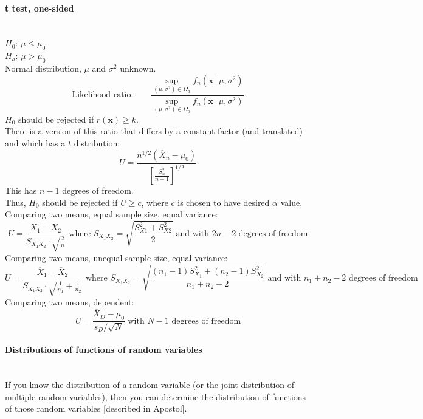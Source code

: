 \documentclass[10pt]{article}
\begin{document}
\paragraph{t test, one-sided}\ \\
$H_0$: $\mu \leq \mu_0$\\
$H_a$: $\mu > \mu_0$\\
Normal distribution, $\mu$ and $\sigma^2$ unknown.
\begin{equation*}
\text{Likelihood ratio:} \qquad \frac{\sup_{(\mu,\sigma^2)\in\Omega_a}{f_n(\boldsymbol{x}\,|\,\mu, \sigma^2)}}
{\sup_{(\mu,\sigma^2)\in\Omega_0}f_n(\boldsymbol{x}\,|\,\mu, \sigma^2)}
\end{equation*}
$H_0$ should be rejected if $r(\boldsymbol{x}) \geq k$.\\
There is a version of this ratio that differs by a constant factor (and translated) and which has a $t$ distribution:
\begin{equation*}
U = \frac{n^{1/2}(\overline{X}_n - \mu_0)}{\left[\frac{S_n^2}{n-1}\right]^{1/2}}
\end{equation*}
This has $n-1$ degrees of freedom.\\
Thus, $H_0$ should be rejected if $U \geq c$, where $c$ is chosen to have desired $\alpha$ value.\\
Comparing two means, equal sample size, equal variance:
\begin{equation*}
U = \frac{\overline{X}_1 - \overline{X}_2}{S_{X_1X_2} \cdot \sqrt{\frac{2}{n}}}
\text{ where } S_{X_1X_2} = \sqrt{\frac{S_{X1}^2 + S_{X2}^2}{2}}
\text{ and with } 2n - 2 \text{ degrees of freedom}
\end{equation*}
Comparing two means, unequal sample size, equal variance:
\begin{equation*}
U = \frac{\overline{X}_1 - \overline{X}_2}{S_{X_1X_2} \cdot \sqrt{\frac{1}{n_1}+\frac{1}{n_2}}}
\text{ where } S_{X_1X_2} = \sqrt{\frac{(n_1-1)S_{X_1}^2 + (n_2-1)S_{X_2}^2}{n_1+n_2 - 2}}
\text{ and with } n_1 + n_2 - 2 \text{ degrees of freedom}
\end{equation*}
Comparing two means, dependent:
\begin{equation*}
U = \frac{\overline{X}_D - \mu_0}{s_D / \sqrt{N}}
\text{ with } N - 1 \text{ degrees of freedom}
\end{equation*}

\paragraph{Distributions of functions of random variables}\ \\
If you know the distribution of a random variable (or the joint distribution of multiple random variables),
then you can determine the distribution of functions of those random variables [described in Apostol].
\end{document}

